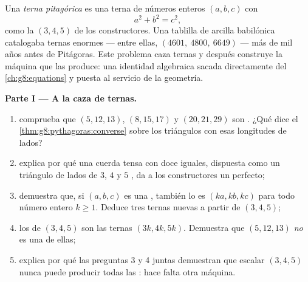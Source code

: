 \begin{problem}[{Problema de fin de semana --- triángulos rectángulos de lados enteros
y la identidad $(m^2 - n^2)^2 + (2mn)^2 = (m^2 + n^2)^2$ que
las genera todas}]
\label{pb:g8:pythagoras:1}
Una \emph{terna pitagórica} es una terna
de números enteros $(a, b, c)$ con
\[
a^2 + b^2 = c^2 ,
\]
como la $(3, 4, 5)$ de los constructores. Una tablilla de arcilla babilónica catalogaba
ternas enormes --- entre ellas, $(4601,\ 4800,\ 6649)$ --- más de
mil años antes de Pitágoras. Este problema caza ternas
y después construye la máquina que las produce: una identidad algebraica
sacada directamente del \cref{ch:g8:equations} y puesta al servicio de la
geometría.

\medskip
\noindent\textbf{Parte I --- A la caza de ternas.}
\begin{enumerate}
  \item comprueba que $(5, 12, 13)$, $(8, 15, 17)$ y
        $(20, 21, 29)$ son . ¿Qué dice el
        \cref{thm:g8:pythagoras:converse} sobre los triángulos con
        esas longitudes de lados?
  \item explica por qué una cuerda tensa con doce  iguales, dispuesta
        como un triángulo de lados de $3$, $4$ y $5$ ,
        da a los constructores un  perfecto;
  \item demuestra que, si $(a, b, c)$ es una , también lo es
        $(ka, kb, kc)$ para todo número entero $k \geq 1$. Deduce
        tres ternas nuevas a partir de $(3, 4, 5)$;
  \item los  de $(3, 4, 5)$ son las ternas
        $(3k, 4k, 5k)$. Demuestra que $(5, 12, 13)$ \emph{no} es una
        de ellas;
  \item explica por qué las preguntas 3 y 4 juntas demuestran que escalar
        $(3, 4, 5)$ nunca puede producir todas las :
        hace falta otra máquina.
\end{enumerate}


\end{problem}
